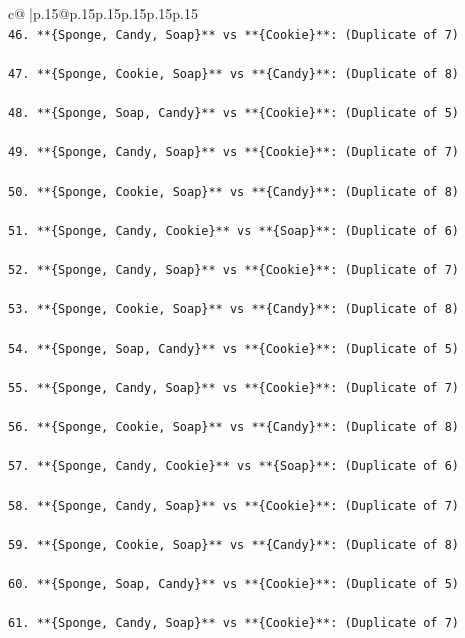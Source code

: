 \documentclass{article}
\begin{document}
{\begin{supertabular}{c@{$\;$}|p{.15\linewidth}@{}p{.15\linewidth}p{.15\linewidth}p{.15\linewidth}p{.15\linewidth}p{.15\linewidth}}
{{{\\ 
\texttt{46. **\{Sponge, Candy, Soap\}** vs **\{Cookie\}**: (Duplicate of 7)} \\
\\ 
\texttt{47. **\{Sponge, Cookie, Soap\}** vs **\{Candy\}**: (Duplicate of 8)} \\
\\ 
\texttt{48. **\{Sponge, Soap, Candy\}** vs **\{Cookie\}**: (Duplicate of 5)} \\
\\ 
\texttt{49. **\{Sponge, Candy, Soap\}** vs **\{Cookie\}**: (Duplicate of 7)} \\
\\ 
\texttt{50. **\{Sponge, Cookie, Soap\}** vs **\{Candy\}**: (Duplicate of 8)} \\
\\ 
\texttt{51. **\{Sponge, Candy, Cookie\}** vs **\{Soap\}**: (Duplicate of 6)} \\
\\ 
\texttt{52. **\{Sponge, Candy, Soap\}** vs **\{Cookie\}**: (Duplicate of 7)} \\
\\ 
\texttt{53. **\{Sponge, Cookie, Soap\}** vs **\{Candy\}**: (Duplicate of 8)} \\
\\ 
\texttt{54. **\{Sponge, Soap, Candy\}** vs **\{Cookie\}**: (Duplicate of 5)} \\
\\ 
\texttt{55. **\{Sponge, Candy, Soap\}** vs **\{Cookie\}**: (Duplicate of 7)} \\
\\ 
\texttt{56. **\{Sponge, Cookie, Soap\}** vs **\{Candy\}**: (Duplicate of 8)} \\
\\ 
\texttt{57. **\{Sponge, Candy, Cookie\}** vs **\{Soap\}**: (Duplicate of 6)} \\
\\ 
\texttt{58. **\{Sponge, Candy, Soap\}** vs **\{Cookie\}**: (Duplicate of 7)} \\
\\ 
\texttt{59. **\{Sponge, Cookie, Soap\}** vs **\{Candy\}**: (Duplicate of 8)} \\
\\ 
\texttt{60. **\{Sponge, Soap, Candy\}** vs **\{Cookie\}**: (Duplicate of 5)} \\
\\ 
\texttt{61. **\{Sponge, Candy, Soap\}** vs **\{Cookie\}**: (Duplicate of 7)} \\
}}}
\end{supertabular}}
\end{document}

